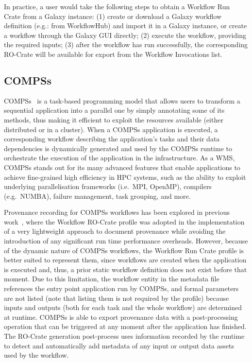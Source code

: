 \documentclass[10pt,letterpaper]{article}
\begin{document}
In practice, a user would take the following steps to obtain a Workflow Run Crate from a Galaxy instance: (1) create or download a Galaxy workflow definition (e.g.: from WorkflowHub) and import it in a Galaxy instance, or create a workflow through the Galaxy GUI directly; (2) execute the workflow, providing the required inputs; (3) after the workflow has run successfully, the corresponding RO-Crate will be available for export from the Workflow Invocations list.


\subsection{COMPSs}\label{compss}

COMPSs~\cite{Lordan 2014} is a task-based programming model that allows users to transform a sequential application into a parallel one by simply annotating some of its methods, thus making it efficient to exploit the resources available (either distributed or in a cluster).
When a COMPSs application is executed, a corresponding workflow describing the application's tasks and their data dependencies is dynamically generated and used by the COMPSs runtime to orchestrate the execution of the application in the infrastructure.
As a WMS, COMPSs stands out for its many advanced features that enable applications to achieve fine-grained high efficiency in HPC systems, such as the ability to exploit underlying parallelisation frameworks (i.e.~MPI, OpenMP), compilers (e.g.~NUMBA), failure management, task grouping, and more.

Provenance recording for COMPSs workflows has been explored in previous work~\cite{Sirvent 2022}, where the Workflow RO-Crate profile was adopted in the implementation of a very lightweight approach to document provenance while avoiding the introduction of any significant run time performance overheads.
However, because of the dynamic nature of COMPSs workflows, the Workflow Run Crate profile is better suited to represent them, since workflows are created when the application is executed and, thus, a prior static workflow definition does not exist before that moment.
Due to this limitation, the workflow entity in the metadata file references the entry point application run by COMPSs, and formal parameters are not listed (note that listing them is not required by the profile) because inputs and outputs (both for each task and the whole workflow) are determined at runtime.
COMPSs is able to export provenance data with a post-processing operation that can be triggered at any moment after the application has finished.
The RO-Crate generation post-process uses information recorded by the runtime to detect and automatically add metadata of any input or output data assets used by the workflow.
\end{document}
